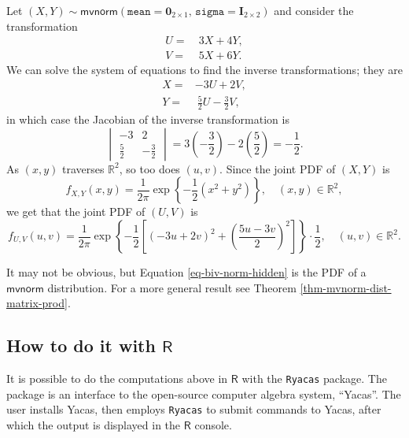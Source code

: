 \documentclass[captions=tableheading]{scrbook}
\begin{document}
\begin{example}
Let \((X,Y)\sim\mathsf{mvnorm}(\mathtt{mean}=\mathbf{0}_{2\times1},\,\mathtt{sigma}=\mathbf{I}_{2\times2})\) and consider the transformation
\begin{align*}
U= & \ 3X+4Y,\\
V= & \ 5X+6Y.
\end{align*}
We can solve the system of equations to find the inverse transformations; they are
\begin{align*}
X= & -3U+2V,\\
Y= & \ \frac{5}{2}U-\frac{3}{2}V,
\end{align*}
in which case the Jacobian of the inverse transformation is
\[
\begin{vmatrix}
-3 & 2\\
\frac{5}{2} & -\frac{3}{2}
\end{vmatrix}
= 3\left(-\frac{3}{2}\right)-2\left(\frac{5}{2}\right) = -\frac{1}{2}.
\]
As \((x,y)\) traverses \(\mathbb{R}^{2}\), so too does \((u,v)\). Since the joint PDF of \((X,Y)\) is
\[
f_{X,Y}(x,y)=\frac{1}{2\pi}\exp\left\{ -\frac{1}{2}\left(x^{2}+y^{2}\right)\right\} ,\quad (x,y)\in\mathbb{R}^{2},
\]
we get that the joint PDF of \((U,V)\) is
\begin{equation}
f_{U,V}(u,v)=\frac{1}{2\pi}\exp\left\{ -\frac{1}{2}\left[\left(-3u+2v\right)^{2}+\left(\frac{5u-3v}{2}\right)^{2}\right]\right\} \cdot\frac{1}{2},\quad (u,v)\in\mathbb{R}^{2}.\label{eq-biv-norm-hidden}
\end{equation}
\end{example}

\begin{rem}
It may not be obvious, but Equation \ref{eq-biv-norm-hidden} is the PDF of a \(\mathsf{mvnorm}\) distribution. For a more general result see Theorem \ref{thm-mvnorm-dist-matrix-prod}.
\end{rem}
\subsection{How to do it with \(\mathsf{R}\)}
\label{sec-7-7-1}
\label{sub-bivariate-transf-R}


It is possible to do the computations above in \(\mathsf{R}\) with the \texttt{Ryacas} package. The package is an interface to the open-source computer algebra system, ``Yacas''. The user installs Yacas, then employs \texttt{Ryacas} to submit commands to Yacas, after which the output is displayed in the \(\mathsf{R}\) console.
\end{document}
